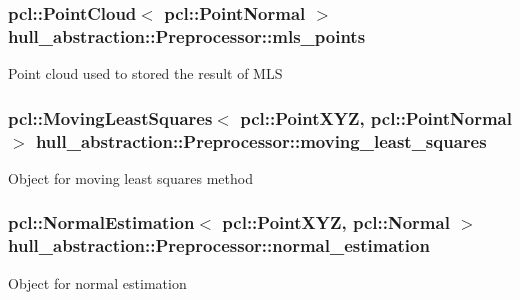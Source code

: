 \subsubsection[{\texorpdfstring{mls\+\_\+points}{mls_points}}]{\setlength{\rightskip}{0pt plus 5cm}pcl\+::\+Point\+Cloud$<$ pcl\+::\+Point\+Normal $>$ hull\+\_\+abstraction\+::\+Preprocessor\+::mls\+\_\+points\hspace{0.3cm}{\ttfamily [private]}}\hypertarget{classhull__abstraction_1_1_preprocessor_af91d53e1e4dadaa51f3518b100598b93}{}\label{classhull__abstraction_1_1_preprocessor_af91d53e1e4dadaa51f3518b100598b93}
Point cloud used to stored the result of M\+LS 
\subsubsection[{\texorpdfstring{moving\+\_\+least\+\_\+squares}{moving_least_squares}}]{\setlength{\rightskip}{0pt plus 5cm}pcl\+::\+Moving\+Least\+Squares$<$ pcl\+::\+Point\+X\+YZ, pcl\+::\+Point\+Normal $>$ hull\+\_\+abstraction\+::\+Preprocessor\+::moving\+\_\+least\+\_\+squares\hspace{0.3cm}{\ttfamily [private]}}\hypertarget{classhull__abstraction_1_1_preprocessor_abc825ebe97845aece984cae1b37208b3}{}\label{classhull__abstraction_1_1_preprocessor_abc825ebe97845aece984cae1b37208b3}
Object for moving least squares method 
\subsubsection[{\texorpdfstring{normal\+\_\+estimation}{normal_estimation}}]{\setlength{\rightskip}{0pt plus 5cm}pcl\+::\+Normal\+Estimation$<$ pcl\+::\+Point\+X\+YZ, pcl\+::\+Normal $>$ hull\+\_\+abstraction\+::\+Preprocessor\+::normal\+\_\+estimation\hspace{0.3cm}{\ttfamily [private]}}\hypertarget{classhull__abstraction_1_1_preprocessor_a144ae161c0d90bcc829f83c49172de82}{}\label{classhull__abstraction_1_1_preprocessor_a144ae161c0d90bcc829f83c49172de82}
Object for normal estimation 
